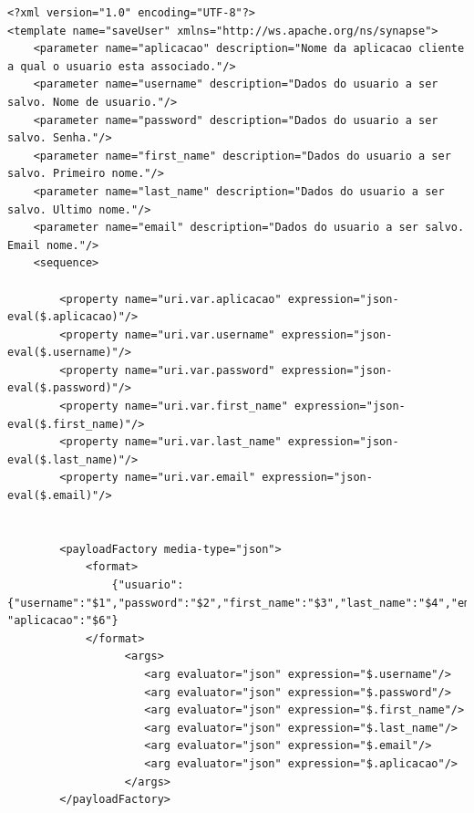 \begin{apendicesenv}

\begin{lstlisting}[caption={Conteúdo do arquivo "saveUser.xml".}]
<?xml version="1.0" encoding="UTF-8"?>
<template name="saveUser" xmlns="http://ws.apache.org/ns/synapse">
    <parameter name="aplicacao" description="Nome da aplicacao cliente a qual o usuario esta associado."/>
    <parameter name="username" description="Dados do usuario a ser salvo. Nome de usuario."/>
    <parameter name="password" description="Dados do usuario a ser salvo. Senha."/>
    <parameter name="first_name" description="Dados do usuario a ser salvo. Primeiro nome."/>
    <parameter name="last_name" description="Dados do usuario a ser salvo. Ultimo nome."/>
    <parameter name="email" description="Dados do usuario a ser salvo. Email nome."/>
    <sequence>

        <property name="uri.var.aplicacao" expression="json-eval($.aplicacao)"/>
        <property name="uri.var.username" expression="json-eval($.username)"/>
        <property name="uri.var.password" expression="json-eval($.password)"/>
        <property name="uri.var.first_name" expression="json-eval($.first_name)"/>
        <property name="uri.var.last_name" expression="json-eval($.last_name)"/>
        <property name="uri.var.email" expression="json-eval($.email)"/>


        <payloadFactory media-type="json">
            <format>
                {"usuario":{"username":"$1","password":"$2","first_name":"$3","last_name":"$4","email":"$5"}, "aplicacao":"$6"}
            </format>
                  <args>
                     <arg evaluator="json" expression="$.username"/>
                     <arg evaluator="json" expression="$.password"/>
                     <arg evaluator="json" expression="$.first_name"/>
                     <arg evaluator="json" expression="$.last_name"/>
                     <arg evaluator="json" expression="$.email"/>
                     <arg evaluator="json" expression="$.aplicacao"/>
                  </args>
        </payloadFactory>


\end{lstlisting}
\end{apendicesenv}
